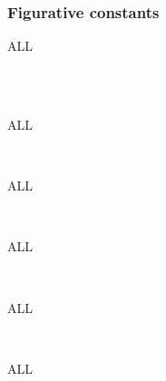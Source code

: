 \subsubsection{Figurative constants}

\begin{syntax}
  ALL
  \begin{1=}
     \\
     \\
  \end{1=}
\end{syntax}

\begin{syntax}
  ALL
  \begin{1=}
     \\
  \end{1=}
\end{syntax}

\begin{syntax}
  ALL
  \begin{1=}
     \\
  \end{1=}
\end{syntax}

\begin{syntax}
  ALL
  \begin{1=}
     \\
  \end{1=}
\end{syntax}

\begin{syntax}
  ALL
  \begin{1=}
     \\
  \end{1=}
\end{syntax}

\begin{syntax}[\miscextcolour]
  ALL
  \begin{1=}
     \\
  \end{1=}
\end{syntax}

\begin{syntax}
   \literal
\end{syntax}

